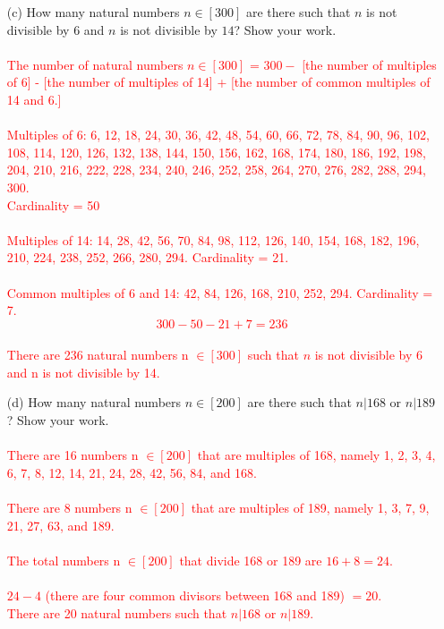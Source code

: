 \documentclass[12pt]{article}
\begin{document}
\begin{enumerate}
\item[(c)] How many natural numbers $n \in [300]$ are there such that $n$ is not divisible by $6$ and $n$ is not divisible by $14$? Show your work. \\
\\ \textcolor{red}{The number of natural numbers $n \in [300]$ = $300-$ [the number of multiples of 6] - [the number of multiples of 14] + [the number of common multiples of 14 and 6.]} \\
\\ \textcolor{red}{Multiples of 6: 6, 12, 18, 24, 30, 36, 42, 48, 54, 60, 66, 72, 78, 84, 90, 96, 102, 108, 114, 120, 126, 132, 138, 144, 150, 156, 162, 168, 174, 180, 186, 192, 198, 204, 210, 216, 222, 228, 234, 240, 246, 252, 258, 264, 270, 276, 282, 288, 294, 300. \\ Cardinality = 50} \\
\\ \textcolor{red}{Multiples of 14: 14, 28, 42, 56, 70, 84, 98, 112, 126, 140, 154, 168, 182, 196, 210, 224, 238, 252, 266, 280, 294. Cardinality = 21.} \\
\\ \textcolor{red}{Common multiples of 6 and 14: 42, 84, 126, 168, 210, 252, 294. Cardinality = 7.}
\\ \textcolor{red}{$$300 - 50 - 21 + 7 = 236$$}
\\ \textcolor{red}{There are 236 natural numbers n $\in [300]$ such that $n$ is not divisible by 6 and n is not divisible by 14.}
\item[(d)] How many natural numbers $n \in [200]$ are there such that $n | 168$ or $n | 189$? Show your work. \\
\\ \textcolor{red}{There are 16 numbers n $\in [200]$ that are multiples of 168, namely 1, 2, 3, 4, 6, 7, 8, 12, 14, 21, 24, 28, 42, 56, 84, and 168.} \\
\\ \textcolor{red}{There are 8 numbers n $\in [200]$ that are multiples of 189, namely 1, 3, 7, 9, 21, 27, 63, and 189.} \\
\\ \textcolor{red}{The total numbers n $\in [200]$ that divide 168 or 189 are $16 + 8 = 24.$  \\
\\ $24 - 4$ (there are four common divisors between 168 and 189) $ = 20$. \\
There are 20 natural numbers such that $n | 168$ or $n | 189$.}


\end{enumerate}
\end{document}
